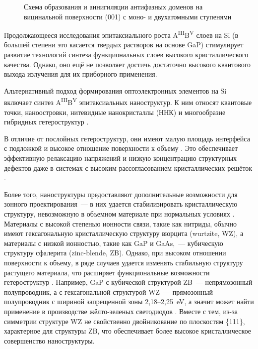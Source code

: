 \begin{figure}[ht]
	\caption{Схема образования и аннигиляции антифазных доменов на вицинальной поверхности (001) с моно- и двухатомными ступенями}\label{fig:Image_2}
\end{figure}

Продолжающееся исследования эпитаксиального роста A\textsuperscript{III}B\textsuperscript{V} слоев на Si (в большей степени это касается твердых растворов на основе GaP) стимулирует развитие технологий синтеза функциональных слоев высокого кристаллического качества. Однако, оно ещё не позволяет достичь достаточно высокого квантового выхода излучения для их приборного применения.

Альтернативный подход формирования оптоэлектронных элементов на Si включает синтез A\textsuperscript{III}B\textsuperscript{V} эпитаксиальных наноструктур. К ним относят квантовые точки, наноостровки, нитевидные нанокристаллы (ННК) и многообразие гибридных гетероструктур \cite{Tan2018}.

В отличие от послойных гетероструктур, они имеют малую площадь интерфейса с подложкой и высокое отношение поверхности к объему \cite{Bolshakov2013, Tchernycheva2007}. Это обеспечивает эффективную релаксацию напряжений и низкую концентрацию структурных дефектов даже в системах с высоким рассогласованием кристаллических решёток \cite{Samsonenko2011}.

Более того, наноструктуры предоставляют дополнительные возможности для зонного проектирования~--- в них удается стабилизировать кристаллическую структуру, невозможную в объемном материале при нормальных условиях \cite{Mohseni2009}. Материалы с высокой степенью ионности связи, такие как нитриды, обычно имеют гексагональную кристаллическую структуру вюрцита (wurtzite, WZ), а материалы с низкой ионностью, такие как GaP и GaAs,~--- кубическую структуру сфалерита (zinc-blende, ZB). Однако, при высоком отношении поверхности к объему, в ряде случаев удается изменять стабильную структуру растущего материала, что расширяет функциональные возможности гетероструктур \cite{Spirkoska2009}. Например, GaP с кубической структурой ZB~--- непрямозонный полупроводник, а с гексагональной структурой WZ~--- прямозонный полупроводник с шириной запрещенной зоны 2,18--2,25~\si{\electronvolt}, а значит может найти применение в производстве жёлто-зеленых светодиодов \cite{Assali2013}. Вместе с тем, из-за симметрии структуре WZ не свойственно двойникование по плоскостям \{111\}, характерное для структуры ZB, что обеспечивает более высокое кристаллическое совершенство наноструктуры.

